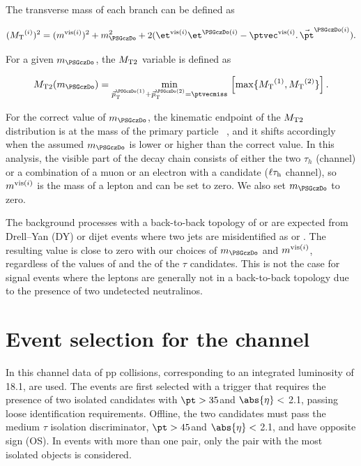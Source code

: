 The transverse mass of each branch can be defined as
\begin{linenomath}
\begin{equation}
\label{eq:mtdef}
(\mt^{(i)})^{2}= (\mvisi)^2+m^2_{\PSGczDo}+2(\etvisi\et^{\PSGczDo(i)}-{\vptvisi}.\,{\vec{\pt}^{\PSGczDo(i)}}).
\end{equation}
\end{linenomath}

For a given $m_{\PSGczDo}$, the ${M_\mathrm{ T2}}$ variable is defined as
\begin{linenomath}
\begin{equation}
\label{eq:mt2def}
\mttwo(m_{\PSGczDo})=\min_{\vec{p}^{\PSGczDo(1)}_\mathrm{T}+\vec{p}_\mathrm{T}^{\PSGczDo(2)}=\ptvecmiss}\,\left[\max\{ \mt^{(1)},\mt^{(2)}\}\right].
\end{equation}
\end{linenomath}

For the correct value of $m_{\PSGczDo}$, the kinematic endpoint of the ${M_\mathrm{ T2}}$ distribution is at the mass of the primary particle ~\cite{Affolder:2000bpa,Abazov:2002bu}, and it shifts accordingly when the assumed $m_{\PSGczDo}$ is lower or higher than the correct value. In this analysis,
the visible part of the decay chain consists of either the two $\tau_h$ (\tauTau channel)
or a combination of a muon or an electron with a \Tau candidate ($\ell\tau_\mathrm{h}$ channel), so $m^{\text{vis}(i)}$ is the mass of a lepton and can be set to zero. We also set $m_{\PSGczDo}$ to zero.


The background processes with a back-to-back topology of \tauTau  or \leptonTau 
are expected from  Drell--Yan (DY) or dijet events 
where two  jets are misidentified as \tauTau or \leptonTau. 
The resulting \mttwo value is close to zero with our choices of $m_{\PSGczDo}$ and $m^{\text{vis}(i)}$, regardless of the values of
\MPT and the \pt of  the $\tau$ candidates. 
This is not the case for signal events where the leptons are generally not in a back-to-back topology due
to the presence of two undetected neutralinos.
\section{\texorpdfstring{Event selection for the \tauTau channel}{Event selection for the tau-tau channel}}
\label{sect:tauTauCuts}
In this channel data of pp collisions,  corresponding to an integrated luminosity of 18.1\fbinv, are used.
The events are first selected with a trigger \cite{Chatrchyan:2011nv} that requires the presence of two isolated
\Tau candidates with $\pt > 35$\GeV and $\abs{\eta}<$ 2.1, passing loose identification requirements.
Offline, the two \Tau candidates must pass the medium $\tau$ isolation discriminator,
$\pt > 45$\GeV and $\abs{\eta}<$ 2.1, and have opposite sign (OS).
In events with more than one \tauTau pair, only the pair with the most isolated \Tau objects is considered.


